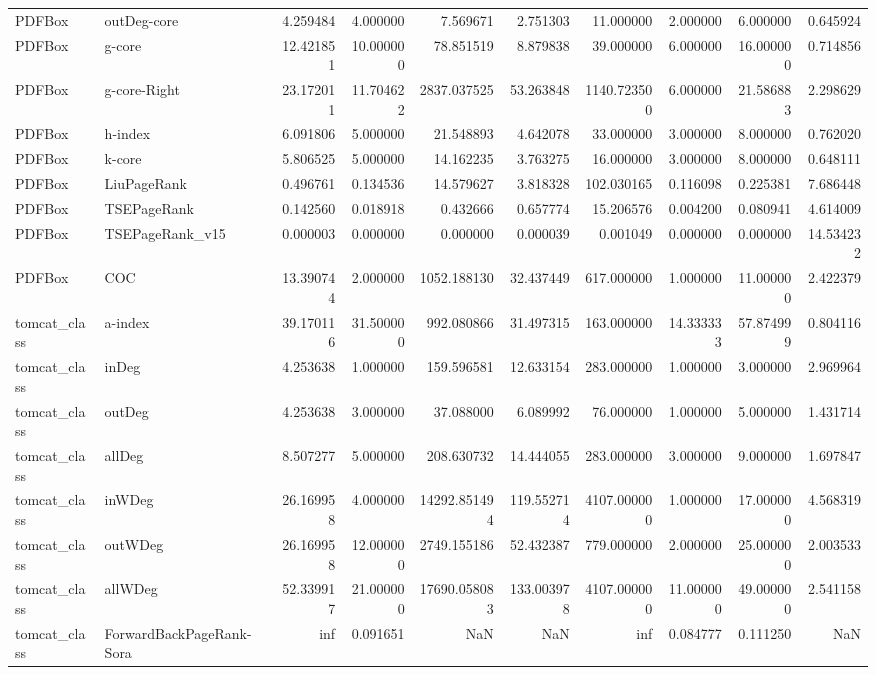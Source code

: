 \begin{tabular}{llrrrrrrrr}
PDFBox & outDeg-core & 4.259484 & 4.000000 & 7.569671 & 2.751303 & 11.000000 & 2.000000 & 6.000000 & 0.645924 \\
PDFBox & g-core & 12.421851 & 10.000000 & 78.851519 & 8.879838 & 39.000000 & 6.000000 & 16.000000 & 0.714856 \\
PDFBox & g-core-Right & 23.172011 & 11.704622 & 2837.037525 & 53.263848 & 1140.723500 & 6.000000 & 21.586883 & 2.298629 \\
PDFBox & h-index & 6.091806 & 5.000000 & 21.548893 & 4.642078 & 33.000000 & 3.000000 & 8.000000 & 0.762020 \\
PDFBox & k-core & 5.806525 & 5.000000 & 14.162235 & 3.763275 & 16.000000 & 3.000000 & 8.000000 & 0.648111 \\
PDFBox & LiuPageRank & 0.496761 & 0.134536 & 14.579627 & 3.818328 & 102.030165 & 0.116098 & 0.225381 & 7.686448 \\
PDFBox & TSEPageRank & 0.142560 & 0.018918 & 0.432666 & 0.657774 & 15.206576 & 0.004200 & 0.080941 & 4.614009 \\
PDFBox & TSEPageRank_v15 & 0.000003 & 0.000000 & 0.000000 & 0.000039 & 0.001049 & 0.000000 & 0.000000 & 14.534232 \\
PDFBox & COC & 13.390744 & 2.000000 & 1052.188130 & 32.437449 & 617.000000 & 1.000000 & 11.000000 & 2.422379 \\
tomcat_class & a-index & 39.170116 & 31.500000 & 992.080866 & 31.497315 & 163.000000 & 14.333333 & 57.874999 & 0.804116 \\
tomcat_class & inDeg & 4.253638 & 1.000000 & 159.596581 & 12.633154 & 283.000000 & 1.000000 & 3.000000 & 2.969964 \\
tomcat_class & outDeg & 4.253638 & 3.000000 & 37.088000 & 6.089992 & 76.000000 & 1.000000 & 5.000000 & 1.431714 \\
tomcat_class & allDeg & 8.507277 & 5.000000 & 208.630732 & 14.444055 & 283.000000 & 3.000000 & 9.000000 & 1.697847 \\
tomcat_class & inWDeg & 26.169958 & 4.000000 & 14292.851494 & 119.552714 & 4107.000000 & 1.000000 & 17.000000 & 4.568319 \\
tomcat_class & outWDeg & 26.169958 & 12.000000 & 2749.155186 & 52.432387 & 779.000000 & 2.000000 & 25.000000 & 2.003533 \\
tomcat_class & allWDeg & 52.339917 & 21.000000 & 17690.058083 & 133.003978 & 4107.000000 & 11.000000 & 49.000000 & 2.541158 \\
tomcat_class & ForwardBackPageRank-Sora & inf & 0.091651 & NaN & NaN & inf & 0.084777 & 0.111250 & NaN \\

\end{tabular}
